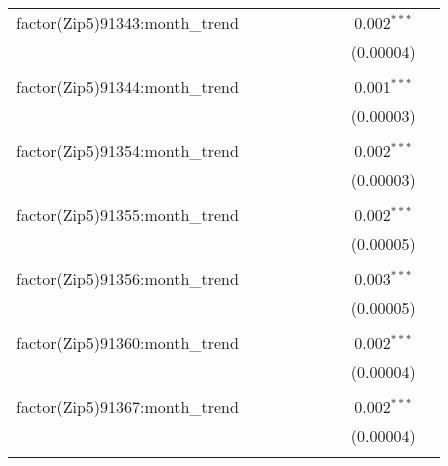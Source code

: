 \begin{table}[H]
{\begin{tabular}{@{\extracolsep{5pt}}lcccccccc}
  factor(Zip5)91343:month\_trend &  &  &  &  &  &  & 0.002$^{***}$ &  \\  

   &  &  &  &  &  &  & (0.00004) &  \\  

   & & & & & & & & \\  

  factor(Zip5)91344:month\_trend &  &  &  &  &  &  & 0.001$^{***}$ &  \\  

   &  &  &  &  &  &  & (0.00003) &  \\  

   & & & & & & & & \\  

  factor(Zip5)91354:month\_trend &  &  &  &  &  &  & 0.002$^{***}$ &  \\  

   &  &  &  &  &  &  & (0.00003) &  \\  

   & & & & & & & & \\  

  factor(Zip5)91355:month\_trend &  &  &  &  &  &  & 0.002$^{***}$ &  \\  

   &  &  &  &  &  &  & (0.00005) &  \\  

   & & & & & & & & \\  

  factor(Zip5)91356:month\_trend &  &  &  &  &  &  & 0.003$^{***}$ &  \\  

   &  &  &  &  &  &  & (0.00005) &  \\  

   & & & & & & & & \\  

  factor(Zip5)91360:month\_trend &  &  &  &  &  &  & 0.002$^{***}$ &  \\  

   &  &  &  &  &  &  & (0.00004) &  \\  

   & & & & & & & & \\  

  factor(Zip5)91367:month\_trend &  &  &  &  &  &  & 0.002$^{***}$ &  \\  

   &  &  &  &  &  &  & (0.00004) &  \\  

   & & & & & & & & \\  


\end{tabular}}
\end{table}
